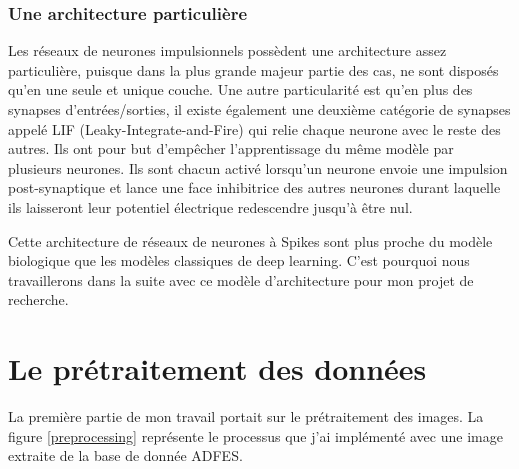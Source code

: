 \documentclass[12pt]{article}
\newcommand{\benjamin}[1]{\textcolor{red}{#1}}
\begin{document}
\subsubsection{Une architecture particulière}

Les réseaux de neurones impulsionnels possèdent une architecture assez particulière, puisque dans la plus grande majeur partie des cas, ne sont disposés qu'en une seule et unique couche. Une autre particularité est qu'en plus des synapses d'entrées/sorties, il existe également une deuxième catégorie de synapses appelé LIF\cite{art4} (Leaky-Integrate-and-Fire) qui relie chaque neurone avec le reste des autres. Ils ont pour but d'empêcher l'apprentissage du même modèle par plusieurs neurones. Ils sont chacun activé lorsqu'un neurone envoie une impulsion post-synaptique et lance une face inhibitrice des autres neurones durant laquelle ils laisseront leur potentiel électrique redescendre jusqu'à être nul.

Cette architecture de réseaux de neurones à Spikes sont plus proche du modèle biologique que les modèles classiques de deep learning. C'est pourquoi nous travaillerons dans la suite avec ce modèle d'architecture pour mon projet de recherche.


\pagebreak


\section{Le prétraitement des données}

La première partie de mon travail portait sur le prétraitement des images. La figure \ref{preprocessing} représente le processus que j'ai implémenté avec une image extraite de la base de donnée ADFES.
\end{document}
